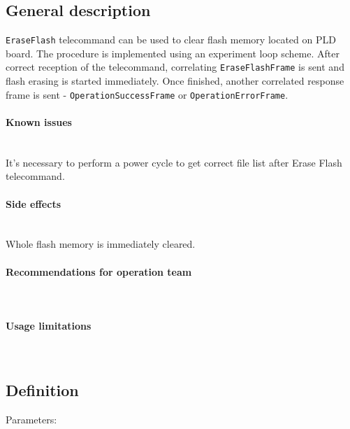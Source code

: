 

\subsection{General description}
\texttt{EraseFlash} telecommand can be used to clear \obc flash memory located on PLD board. The procedure is implemented using an experiment loop scheme. After correct reception of the telecommand, correlating \texttt{EraseFlashFrame} is sent and flash erasing is started immediately. Once finished, another correlated response frame is sent - \texttt{OperationSuccessFrame} or \texttt{OperationErrorFrame}.

\paragraph{Known issues} \mbox{} \\
It's necessary to perform a power cycle to get correct file list after Erase Flash telecommand.

\paragraph{Side effects} \mbox{} \\
Whole flash memory is immediately cleared.

\paragraph{Recommendations for operation team} \mbox{} \\
\None

\paragraph{Usage limitations} \mbox{} \\ 
\None

\subsection{Definition}

Parameters: 

\begin{tcarglist}
\end{tcarglist}

